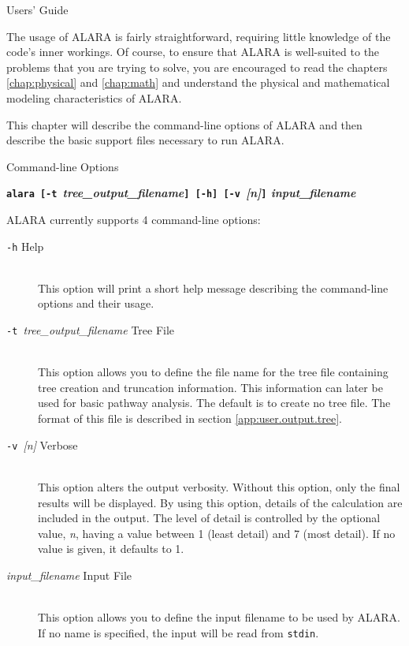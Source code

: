 \addtocounter{tocdepth}{-1}
\begin{chapter}{Users' Guide\label{app:user.guide}}
  
  The usage of ALARA is fairly straightforward, requiring little
  knowledge of the code's inner workings.  Of course, to ensure that
  ALARA is well-suited to the problems that you are trying to solve,
  you are encouraged to read the chapters \ref{chap:physical} and
  \ref{chap:math} and understand the physical and mathematical
  modeling characteristics of ALARA.
  
  This chapter will describe the command-line options of ALARA and
  then describe the basic support files necessary to run ALARA.
  
  \begin{section}{Command-line Options}\label{app:user.cmd}
    
    \begin{center}
      \textbf{\texttt{alara [-t }\textsl{tree\_output\_filename}\texttt{]
          [-h] [-v }\textsl{[n]}\texttt{]} \textsl{input\_filename}}
    \end{center}
    ALARA currently supports 4 command-line options:
    \begin{description}
    \item[\texttt{-h} Help]\ \\
      This option will print a short help message describing the
      command-line options and their usage.
    \item[\texttt{-t }\textsl{tree\_output\_filename} Tree File]\ \\
      This option allows you to define the file name for the tree file
      containing tree creation and truncation information.  This
      information can later be used for basic pathway analysis.  The
      default is to create no tree file.  The format of this file is
      described in section \ref{app:user.output.tree}.
    \item[\texttt{-v }\textsl{[n]} Verbose]\ \\
      This option alters the output verbosity.  Without this option,
      only the final results will be displayed.  By using this option,
      details of the calculation are included in the output.  The
      level of detail is controlled by the optional value, \textsl{n},
      having a value between 1 (least detail) and 7 (most detail).  If
      no value is given, it defaults to 1.
    \item[\textsl{input\_filename} Input File]\ \\
      This option allows you to define the input filename to be used
      by ALARA.  If no name is specified, the input will be read from
      \texttt{stdin}.
    \end{description}
    

\end{section}
\end{chapter}
